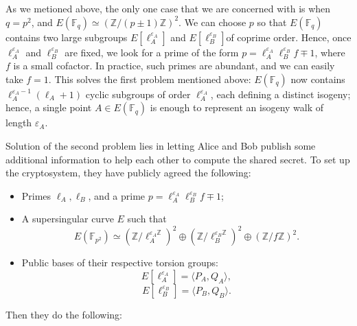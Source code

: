 \documentclass{article}
\theoremstyle{theorem}
\theoremstyle{definition}
\begin{document}
As we metioned above, the only one case that we are concerned with is when $q = p^2$, and $E(\mathbb{F}_q) \simeq (\mathbb{Z}/(p \pm 1)\mathbb{Z})^2$. We can choose $p$ so that $E(\mathbb{F}_q)$ contains two large subgroups $E[\ell_A^{\varepsilon_A}]$ and $E[\ell_B^{\varepsilon_B}]$of coprime order. Hence, once $\ell_A^{\varepsilon_A}$ and $\ell_B^{\varepsilon_B}$ are fixed, we look for a prime of the form $p = \ell_A^{\varepsilon_A} \ell_B^{\varepsilon_B}f \mp 1$, where $f$ is a small cofactor. In practice, such primes are abundant, and we can easily take $f = 1$. This solves the first problem mentioned above: $E(\mathbb{F}_q)$ now contains $\ell_A^{\varepsilon_A - 1}(\ell_A + 1)$  cyclic subgroups of order $\ell_A^{\varepsilon_A}$, each defining a distinct isogeny; hence, a single point $A \in E(\mathbb{F}_q)$ is enough to represent an isogeny walk of length $\varepsilon_A$.

Solution of the second problem lies in letting Alice and Bob publish some additional information to help each other to compute the shared secret. To set up the cryptosystem, they have publicly agreed the following:

\begin{itemize}
	\item Primes $\ell_A, \ell_B$, and a prime $p = \ell_A^{\varepsilon_A}\ell_B^{\varepsilon_B}f \mp 1$;
	
	\item A supersingular curve $E$ such that
		\[E(\mathbb{F}_{p^2}) \simeq (\mathbb{Z}/\ell_A^{\varepsilon_A\mathbb{Z}})^2 \oplus (\mathbb{Z}/\ell_B^{\varepsilon_B\mathbb{Z}})^2 \oplus (\mathbb{Z}/f\mathbb{Z})^2. \]
		
	\item Public bases of their respective torsion groups:
		\[ E[\ell_A^{\varepsilon_A}] = \langle P_A, Q_A \rangle, \]
		\[ E[\ell_B^{\varepsilon_B}] = \langle P_B, Q_B \rangle. \]
\end{itemize}

Then they do the following:
\end{document}
